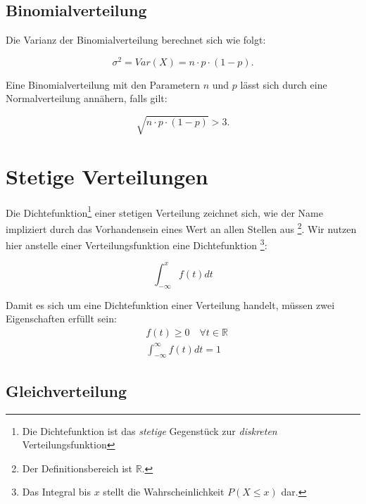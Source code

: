 \documentclass{tufte-handout}
\theoremstyle{own}
\begin{document}
\subsection{Binomialverteilung}

Die Varianz der Binomialverteilung berechnet sich wie folgt:

\begin{equation}
	\sigma^2 = Var(X) = n \cdot p \cdot (1-p).
\end{equation}

Eine Binomialverteilung mit den Parametern $n$ und $p$ lässt sich durch eine Normalverteilung annähern,
falls gilt: 

\begin{equation}
\sqrt{n \cdot p \cdot (1-p)} > 3.
\end{equation}

\section{Stetige Verteilungen}

Die Dichtefunktion\footnote{Die Dichtefunktion ist das \textit{stetige} Gegenstück zur \textit{diskreten} Verteilungsfunktion}
einer stetigen Verteilung zeichnet sich, wie der Name impliziert durch das Vorhandensein eines Wert an allen Stellen aus
\footnote{Der Definitionsbereich ist $\mathbb{R}$.}. 
Wir nutzen hier anstelle einer Verteilungsfunktion eine Dichtefunktion
\footnote{Das Integral bis $x$ stellt die Wahrscheinlichkeit $P(X \leq x)$ dar.}:

\begin{equation}
	\int_{-\infty}^x f(t) dt 
\end{equation}

Damit es sich um eine Dichtefunktion einer Verteilung handelt, müssen zwei Eigenschaften erfüllt sein:
\begin{align}
&f(t) \geq 0 \hspace{1em} \forall t \in \mathbb{R} \label{dichteeig:1}\\
&\int_{-\infty}^{\infty} f(t) dt =1 \label{dichteeig:2}
\end{align}

\subsection{Gleichverteilung}
\end{document}
